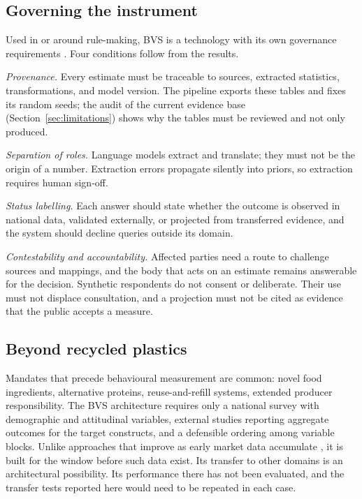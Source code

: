 \subsection{Governing the instrument}

Used in or around rule-making, BVS is a technology with its own governance
requirements \citep{stilgoe2013}. Four conditions follow from the results.

\emph{Provenance.} Every estimate must be traceable to sources, extracted
statistics, transformations, and model version. The pipeline exports these
tables and fixes its random seeds; the audit of the current evidence base
(Section~\ref{sec:limitations}) shows why the tables must be reviewed and not
only produced.

\emph{Separation of roles.} Language models extract and translate; they must
not be the origin of a number. Extraction errors propagate silently into
priors, so extraction requires human sign-off.

\emph{Status labelling.} Each answer should state whether the outcome is
observed in national data, validated externally, or projected from transferred
evidence, and the system should decline queries outside its domain.

\emph{Contestability and accountability.} Affected parties need a route to
challenge sources and mappings, and the body that acts on an estimate remains
answerable for the decision. Synthetic respondents do not consent or
deliberate. Their use must not displace consultation, and a projection must
not be cited as evidence that the public accepts a measure.

\subsection{Beyond recycled plastics}

Mandates that precede behavioural measurement are common: novel food
ingredients, alternative proteins, reuse-and-refill systems, extended producer
responsibility. The BVS architecture requires only a national survey with
demographic and attitudinal variables, external studies reporting aggregate
outcomes for the target constructs, and a defensible ordering among variable
blocks. Unlike approaches that improve as early market data accumulate
\citep{lee2012}, it is built for the window before such data exist. Its
transfer to other domains is an architectural possibility. Its performance
there has not been evaluated, and the transfer tests reported here would need
to be repeated in each case.


